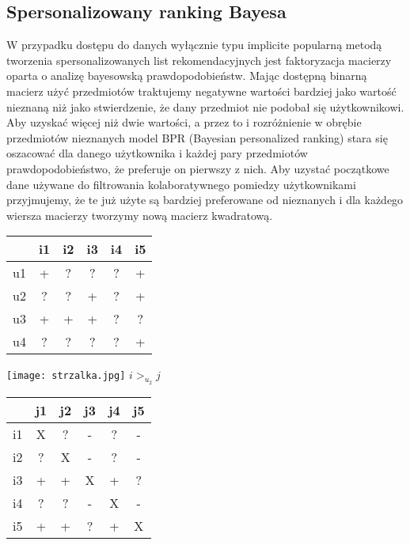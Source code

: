 \documentclass{pracamgr}
\begin{document}
   \subsection{Spersonalizowany ranking Bayesa}
    W przypadku dostępu do danych wyłącznie typu implicite popularną metodą tworzenia spersonalizowanych list rekomendacyjnych jest
    faktoryzacja macierzy oparta o analizę bayesowską prawdopodobieństw.\newline
    Mając dostępną binarną macierz użyć przedmiotów traktujemy negatywne wartości bardziej jako wartość nieznaną niż jako stwierdzenie,
    że dany przedmiot nie podobał się użytkownikowi. Aby uzyskać więcej niż dwie wartości, a przez to i rozróżnienie w obrębie przedmiotów nieznanych
    model BPR (Bayesian personalized ranking) stara się oszacować dla danego użytkownika i każdej pary przedmiotów prawdopodobieństwo,
    że preferuje on pierwszy z nich. Aby uzystać początkowe dane używane do filtrowania kolaboratywnego pomiedzy użytkownikami
    przyjmujemy, że te już użyte są bardziej preferowane od nieznanych i dla każdego wiersza macierzy tworzymy nową macierz kwadratową.
    \begin{multicols}{3}
     \begin{tabular}{c|c|c|c|c|c|}
       & i1 & i2 & i3 & i4 & i5 \\
      \hline
      u1 & + & ? & ? & ? & + \\
      \hline
      u2 & ? & ? & + & ? & + \\    
      \hline
      u3 & + & + & + & ? & ? \\    
      \hline
      u4 & ? & ? & ? & ? & + \\    
     \end{tabular}
     \begin{center}
      \texttt{[image: strzalka.jpg]}\newline
      $i>_{u_2}j$
     \end{center}
     \begin{tabular}{c|c|c|c|c|c|}
       & j1 & j2 & j3 & j4 & j5 \\
      \hline
      i1 & X & ? & - & ? & - \\
      \hline
      i2 & ? & X & - & ? & - \\    
      \hline
      i3 & + & + & X & + & ? \\    
      \hline
      i4 & ? & ? & - & X & - \\
      \hline
      i5 & + & + & ? & + & X \\ 
     \end{tabular}
    \end{multicols}
\end{document}
